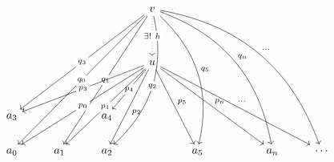 \documentclass[uplatex,a4j,12pt,dvipdfmx]{jsarticle}
\begin{document}
\[
	\begin{tikzcd}
		&       &       & v \arrow[lllddddd, "q_{0}" description] \arrow[llldddd, "q_{3}" description] \arrow[llddddd, "q_{1}" description] \arrow[rrrddddd, "q_{n}", bend left] \arrow[rddddd, "q_{5}", bend left] \arrow[lddddd, "q_{2}" description, bend left] \arrow[rrrrddddd, "\cdots", bend left] \arrow[dd, "\exists ! \ h" description, dotted] &       &  &       &        \\
		&       &       &                                                                                                                                                                                                                                                                                                                                 &       &  &       &        \\
		&       &       & u \arrow[lllddd, "p_{0}" description] \arrow[llldd, "p_{3}" description] \arrow[ldd, "p_{4}" description] \arrow[llddd, "p_{1}" description] \arrow[rddd, "p_{5}"] \arrow[rrrddd, "p_{n}"] \arrow[lddd, "p_{2}"] \arrow[rrrrddd, "\cdots"]                                                                                      &       &  &       &        \\
		&       &       &                                                                                                                                                                                                                                                                                                                                 &       &  &       &        \\
		a_{3} &       & a_{4} &                                                                                                                                                                                                                                                                                                                                 &       &  &       &        \\
		a_{0} & a_{1} & a_{2} &                                                                                                                                                                                                                                                                                                                                 & a_{5} &  & a_{n} & \cdots
	\end{tikzcd}
\]
\end{document}
